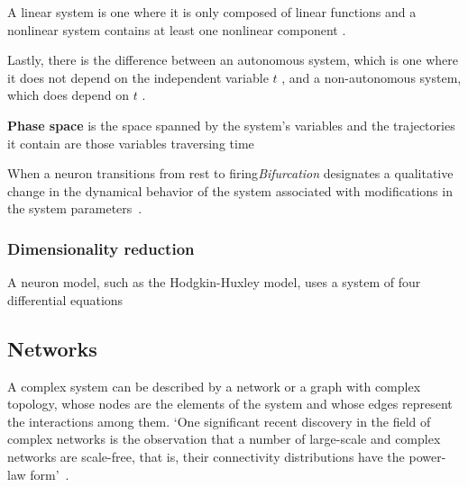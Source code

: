\documentclass[../../Orator.tex]{subfiles}
\begin{document}
A linear system is one where it is only composed of linear functions and a nonlinear system contains at least one nonlinear component \cite{}.

Lastly, there is the difference between an autonomous system, which is one where it does not depend on the independent variable \(t\) \cite{}, and a non-autonomous system, which does depend on \(t\) \cite{}.


\begin{comment}
    \begin{split}\left[\begin{array}{ccll}
    {\displaystyle \frac{du}{dt}} &=& u\left(1-u^{2}\right)-w+I \equiv F(u,w)\\[.2cm]
    {\displaystyle \frac{dw}{dt}} &=& \varepsilon \left(u -0.5w+1\right) \equiv \varepsilon G(u,w)\, ,\\
    \end{array}\right.\end{split}
    [ref:https://neuronaldynamics-exercises.readthedocs.io/en/latest/exercises/brunel-network.html]
\end{comment}

\textbf{Phase space} is the space spanned by the system's variables and the trajectories it contain are those variables traversing time

When a neuron transitions from rest to firing\textit{Bifurcation} designates a qualitative change in the dynamical behavior of the system associated with modifications in the system parameters~\cite{STEFANESCU2012748}.




\subsubsection{Dimensionality reduction}
A neuron model, such as the Hodgkin-Huxley model, uses a system of four differential equations

\subsection*{Networks}
A complex system can be described by a network or a graph with complex topology, whose nodes are the elements of the system and whose edges represent the interactions among them. `One significant recent discovery in the field of complex networks is the observation that a number of large-scale and complex networks are scale-free, that is, their connectivity distributions have the
power-law form'~\cite{wang2002synchronization}.
\end{document}
